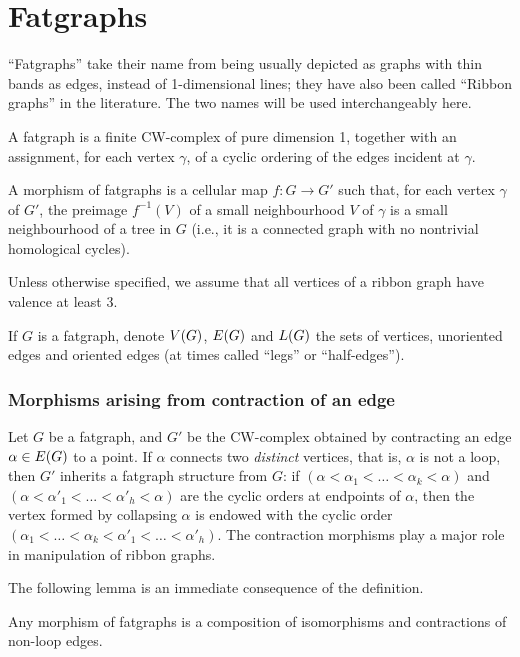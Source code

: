 \section{Fatgraphs}
\label{sec:fatgraphs}

``Fatgraphs'' take their name from being usually depicted as graphs
with thin bands as edges, instead of 1-dimensional lines; they have
also been called ``Ribbon graphs'' in the literature.  The two names
will be used interchangeably here.

\begin{definition}
  \label{dfn:fatgraphs}
  A fatgraph is a finite CW-complex of pure dimension 1, together
  with an assignment, for each vertex $\gamma$, of a cyclic ordering of the
  edges incident at $\gamma$.

  A morphism of fatgraphs is a cellular map $f:G\to G'$ such that,
  for each vertex $\gamma$ of $G'$, the preimage $f^{-1}(V)$ of a small
  neighbourhood $V$ of $\gamma$ is a small neighbourhood of a tree in $G$
  (i.e., it is a connected graph with no nontrivial homological
  cycles).
\end{definition}
Unless otherwise specified, we assume that all vertices of a ribbon
graph have valence at least 3.

If $G$ is a fatgraph, denote $V(G)$, $E(G)$ and
$L(G)$ the sets of vertices, unoriented edges and oriented edges
(at times called ``legs'' or ``half-edges'').

\subsubsection{Morphisms arising from contraction of an edge}
\label{sec:contractions}
Let $G$ be a fatgraph, and $G'$ be the CW-complex obtained by
contracting an edge $\alpha \in E(G)$ to a point.  If $\alpha$ connects two
\emph{distinct} vertices, that is, $\alpha$ is not a loop, then $G'$
inherits a fatgraph structure from $G$: if $(\alpha < \alpha_1 < \ldots < \alpha_k <
\alpha)$ and $(\alpha < \alpha'_1 < ... < \alpha'_h < \alpha)$ are the cyclic orders at
endpoints of $\alpha$, then the vertex formed by collapsing $\alpha$ is endowed
with the cyclic order $(\alpha_1 < \ldots < \alpha_k < \alpha'_1 < \ldots < \alpha'_h)$.  The
contraction morphisms play a major role in manipulation of ribbon
graphs.

The following lemma is an immediate consequence of the definition.
\begin{lemma}\label{lemma:contraction1}
  Any morphism of fatgraphs is a composition of isomorphisms and
  contractions of non-loop edges.
\end{lemma}


